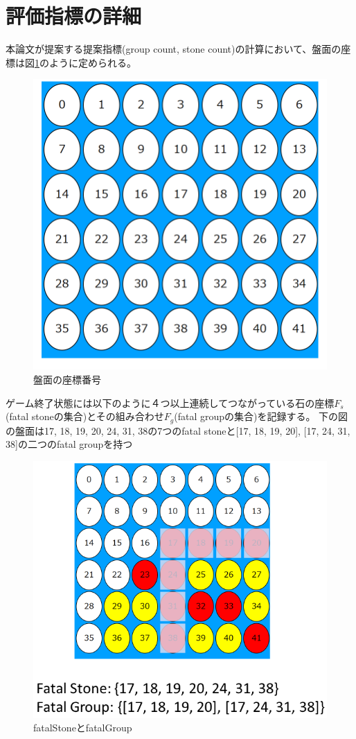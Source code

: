 \section{評価指標の詳細}
本論文が提案する提案指標(group count, stone count)の計算において、盤面の座標は図\ref{fig:index}のように定められる。
\begin{figure}[t]
	\centering
	\includegraphics[width=\linewidth]{./figure/index.png}
	\caption{盤面の座標番号}
	\label{fig:index}
\end{figure}
ゲーム終了状態には以下のように４つ以上連続してつながっている石の座標$F_s$(fatal stoneの集合)とその組み合わせ$F_g$(fatal groupの集合)を記録する。
下の図の盤面は{17, 18, 19, 20, 24, 31, 38}の7つのfatal stoneと{[17, 18, 19, 20], [17, 24, 31, 38]}の二つのfatal groupを持つ
\begin{figure}[t]
	\centering
	\includegraphics[width=\linewidth]{./figure/fatalGroup.png}
	\caption{fatalStoneとfatalGroup}
	\label{fig:fatalGroup}
\end{figure}
